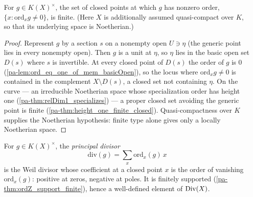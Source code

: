 \begin{theorem}
  \label{pa-thm:ordZ_support_finite}
  \leanok

  For \(g \in K(X)^\times\), the set of closed points at which \(g\) has nonzero order,
  \(\{ x : \mathrm{ord}_x g \neq 0 \}\), is finite. (Here \(X\) is additionally assumed
  quasi-compact over \(K\), so that its underlying space is Noetherian.)
\end{theorem}
\begin{proof}
  \leanok
  Represent \(g\) by a section \(s\) on a nonempty open \(U \ni \eta\) (the generic point lies in
  every nonempty open). Then \(g\) is a unit at \(\eta\), so \(\eta\) lies in the basic open set
  \(D(s)\) where \(s\) is invertible. At every closed point of \(D(s)\) the order of \(g\) is \(0\)
  (\ref{pa-lem:ord_eq_one_of_mem_basicOpen}), so the locus where \(\mathrm{ord}_x g \neq 0\) is
  contained in the complement \(X \setminus D(s)\), a closed set not containing \(\eta\). On the
  curve --- an irreducible Noetherian space whose specialization order has height one
  (\ref{pa-thm:relDim1_specializes}) --- a proper closed set avoiding the generic point is finite
  (\ref{pa-thm:height_one_finite_closed}). Quasi-compactness over \(K\) supplies the Noetherian
  hypothesis: finite type alone gives only a locally Noetherian space.
\end{proof}

\begin{definition}
  \label{pa-def:divOf}
  \leanok

  For \(g \in K(X)^\times\), the \emph{principal divisor}
  \[
    \mathrm{div}(g) = \sum_{x} \mathrm{ord}_x(g)\, x
  \]
  is the Weil divisor whose coefficient at a closed point \(x\) is the order of vanishing
  \(\mathrm{ord}_x(g)\): positive at zeros, negative at poles. It is finitely supported
  (\ref{pa-thm:ordZ_support_finite}), hence a well-defined element of \(\operatorname{Div}(X)\).
\end{definition}

